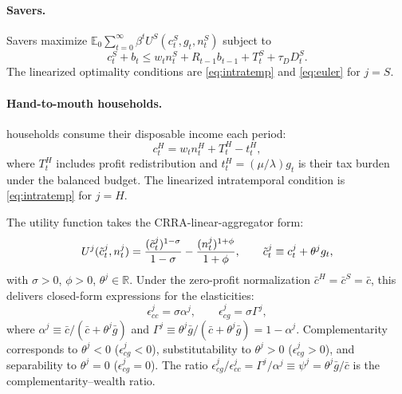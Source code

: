 \paragraph{Savers.}
Savers maximize
$\mathbb{E}_{0}\sum_{t=0}^{\infty}\beta^{t}U^{S}(c^{S}_{t},g_{t},n^{S}_{t})$
subject to
\begin{equation}\label{eq:saver-budget}
  c^{S}_{t}+b_{t}\le w_{t}n^{S}_{t}+R_{t-1}b_{t-1}+T^{S}_{t}+\tau_{D}D^{S}_{t}.
\end{equation}
The linearized optimality conditions are \eqref{eq:intratemp} and
\eqref{eq:euler} for $j=S$.

\paragraph{Hand-to-mouth households.}
\HtM{} households consume their disposable income each period:
\begin{equation}\label{eq:htm-budget}
  c^{H}_{t}=w_{t}n^{H}_{t}+T^{H}_{t}-t^{H}_{t},
\end{equation}
where $T^{H}_{t}$ includes profit redistribution and $t^{H}_{t}=(\mu/\lambda)g_{t}$
is their tax burden under the balanced budget. The linearized intratemporal
condition is \eqref{eq:intratemp} for $j=H$.

\begin{assumption}
\label{asm:linear}
The utility function takes the CRRA-linear-aggregator form:
\begin{equation}\label{eq:linear-util}
  U^{j}(\tilde c^{j}_{t},n^{j}_{t})=\frac{(\tilde c^{j}_{t})^{1-\sigma}}{1-\sigma}
  -\frac{(n^{j}_{t})^{1+\phi}}{1+\phi},\qquad
  \tilde c^{j}_{t}\equiv c^{j}_{t}+\theta^{j}g_{t},
\end{equation}
with $\sigma>0$, $\phi>0$, $\theta^{j}\in\mathbb{R}$. Under the zero-profit
normalization $\bar c^{H}=\bar c^{S}=\bar c$, this delivers closed-form
expressions for the elasticities:
\begin{equation}\label{eq:linear-elasticities}
  \epsilon^{j}_{cc}=\sigma\alpha^{j},\qquad
  \epsilon^{j}_{cg}=\sigma\Gamma^{j},
\end{equation}
where
$\alpha^{j}\equiv\bar c/(\bar c+\theta^{j}\bar g)$ and
$\Gamma^{j}\equiv\theta^{j}\bar g/(\bar c+\theta^{j}\bar g)=1-\alpha^{j}$.
Complementarity corresponds to $\theta^{j}<0$ ($\epsilon^{j}_{cg}<0$),
substitutability to $\theta^{j}>0$ ($\epsilon^{j}_{cg}>0$), and separability to
$\theta^{j}=0$ ($\epsilon^{j}_{cg}=0$). The ratio
$\epsilon^{j}_{cg}/\epsilon^{j}_{cc}=\Gamma^{j}/\alpha^{j}\equiv\psi^{j}
=\theta^{j}\bar g/\bar c$ is the complementarity--wealth ratio.
\end{assumption}

